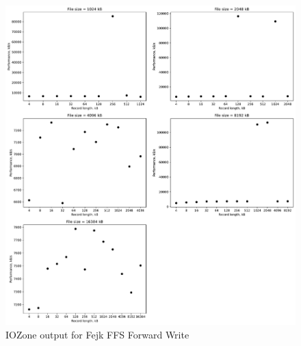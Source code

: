 \begin{figure}[!htb]
	\label{fig:app_benchf_ffs_write}
	\begin{center}
		\includegraphics[width=1.0\textwidth]{figures/benchmarking/fake-ffs/Write.pdf}
	\end{center}
	\caption{IOZone output for Fejk FFS Forward Write}
\end{figure}

